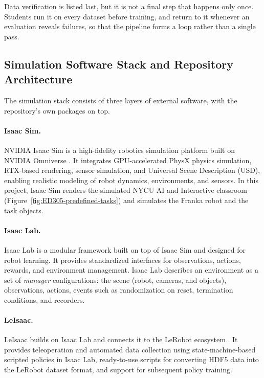 \documentclass[11pt]{article}
\begin{document}
Data verification is listed last, but it is not a final step that happens only once. Students run it on every dataset
before training, and return to it whenever an evaluation reveals failures, so that the pipeline forms a loop rather
than a single pass.


\subsection{Simulation Software Stack and Repository Architecture}
\label{sec:layout-concept}

The simulation stack consists of three layers of external software, with the repository's own packages on top.

\paragraph{Isaac Sim.}
NVIDIA Isaac Sim \cite{isaacsim2026} is a high-fidelity robotics simulation platform built on NVIDIA Omniverse \cite{nvidia_omniverse_website}. It integrates GPU-accelerated PhysX physics simulation, RTX-based rendering, sensor simulation, and Universal Scene Description (USD), enabling realistic modeling of robot dynamics, environments, and sensors. In this project, Isaac Sim renders the simulated NYCU AI and Interactive classroom (Figure~\ref{fig:ED305-predefined-tasks}) and simulates the Franka robot and the task objects.

\paragraph{Isaac Lab.}
Isaac Lab \cite{isaaclab,mittal2025isaaclab} is a modular framework built on top of Isaac Sim and designed for robot
learning. It provides standardized interfaces for observations, actions, rewards, and environment management. Isaac Lab 
describes an environment as a set of \emph{manager} configurations: the scene (robot, cameras, and objects), observations, 
actions, events such as randomization on reset, termination conditions, and recorders.

\paragraph{LeIsaac.}
LeIsaac \cite{leisaac} builds on Isaac Lab and connects it to the LeRobot ecosystem \cite{cadene2024lerobot}. It provides 
teleoperation and automated data collection using state-machine-based scripted policies in Isaac Lab, ready-to-use scripts 
for converting HDF5 data into the LeRobot dataset format\cite{lerobot_dataset_v3}, and support for subsequent policy training.
\end{document}
